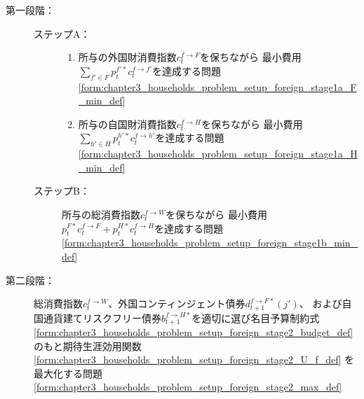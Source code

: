 \begin{description}
    \item[第一段階：]
    \label{itm:chapter3_households_problem_setup_foreign_two_stage_stage1}
        \begin{description}
            \item[ステップA：]
            \label{itm:chapter3_households_problem_setup_foreign_two_stage_stage1_step_a}
                \begin{enumerate}
                    \item
                    \label{itm:chapter3_households_problem_setup_foreign_two_stage_stage1_step_a_1}
                        所与の外国財消費指数\(c_t^{f\to F}\)を保ちながら
                        最小費用\(\sum_{f'\in F}p_t^{f'*}c_t^{f\to f'}\)を達成する問題
                        \eqref{form:chapter3_households_problem_setup_foreign_stage1a_F_min_def}
                    \item
                    \label{itm:chapter3_households_problem_setup_foreign_two_stage_stage1_step_a_2}
                        所与の自国財消費指数\(c_t^{f\to H}\)を保ちながら
                        最小費用\(\sum_{h'\in H}p_t^{h'*}c_t^{f\to h'}\)を達成する問題
                        \eqref{form:chapter3_households_problem_setup_foreign_stage1a_H_min_def}
                \end{enumerate}
            \item[ステップB：]
            \label{itm:chapter3_households_problem_setup_foreign_two_stage_stage1_step_b}
                所与の総消費指数\(c_t^{f\to W}\)を保ちながら
                最小費用\(p_t^{F*}c_t^{f\to F}+p_t^{H*}c_t^{f\to H}\)を達成する問題
                \eqref{form:chapter3_households_problem_setup_foreign_stage1b_min_def}
        \end{description}
    \item[第二段階：]
    \label{itm:chapter3_households_problem_setup_foreign_two_stage_stage2}
        総消費指数\(c_t^{f\to W}\)、外国コンティンジェント債券\(d_{t+1}^{f\to F*}(j')\)、
        および自国通貨建てリスクフリー債券\(b_{t+1}^{f\to H*}\)を適切に選び名目予算制約式
        \eqref{form:chapter3_households_problem_setup_foreign_stage2_budget_def}
        のもと期待生涯効用関数
        \eqref{form:chapter3_households_problem_setup_foreign_stage2_U_f_def}
        を最大化する問題
        \eqref{form:chapter3_households_problem_setup_foreign_stage2_max_def}
\end{description}

